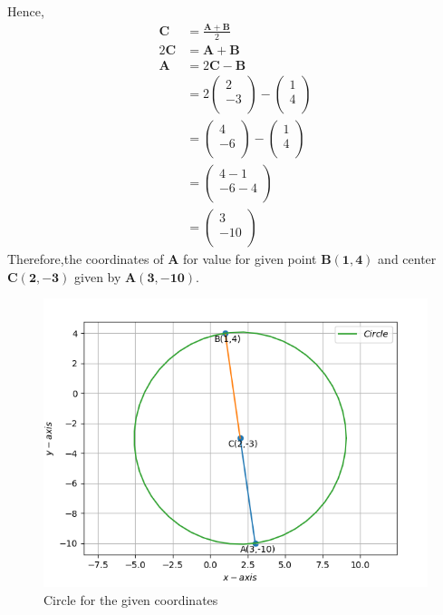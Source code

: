 \documentclass[12pt]{article}
\newcommand{\myvec}[1]{\ensuremath{\begin{pmatrix}#1\end{pmatrix}}}
\let\vec\mathbf
\begin{document}
\begin{enumerate}
Hence,	
	\begin{align}
	\vec{C} &= \frac{\vec{A+B}}{2} \\
	2\vec{C} &= \vec{A}+\vec{B} \\
	\vec{A} &= 2\vec{C}-\vec{B} \\
	 &= 2\myvec{2\\-3\\}-\myvec{1\\4\\} \\
	 &= \myvec{4\\-6\\}-\myvec{1\\4\\} \\
	 &= \myvec{4-1\\-6-4\\} \\	
	 &= \myvec{3\\-10\\}	
	\end{align}       
    Therefore,the coordinates of $\vec{A}$ for value for given point $\vec{B(1,4)}$ and center $\vec{C(2,-3)}$ given by $\vec{A(3,-10)}$.	
\hspace{5mm}
\begin{figure}[!h]
\begin{center}	
	\includegraphics[width=\columnwidth]{./figs/Vector1.png}
\end{center}
\caption{Circle for the given coordinates}
\label{fig:Fig}
\end{figure}
\end{enumerate}
\end{document}
